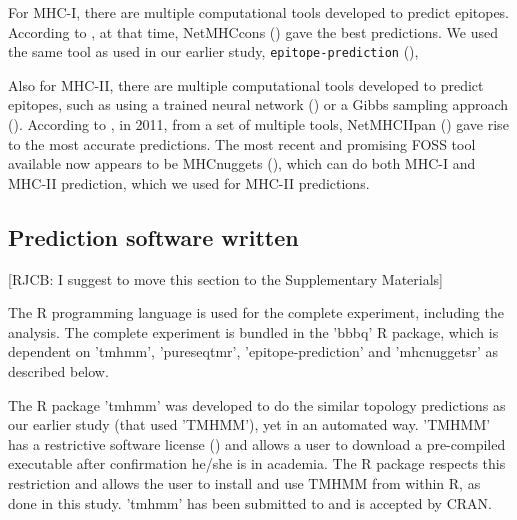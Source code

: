 
For MHC-I, there are multiple computational tools developed 
to predict epitopes. 
According to \cite{lundegaard2011prediction}, at that time,
NetMHCcons (\cite{karosiene2012netmhccons}) gave the best predictions.
We used the same tool as used in our earlier study, \verb;epitope-prediction; (\cite{bianchi2017}),


Also for MHC-II, there are multiple computational tools developed 
to predict epitopes,
such as using a trained neural network (\cite{nielsen2003reliable})
or a Gibbs sampling approach (\cite{nielsen2004improved}).
According to \cite{lundegaard2011prediction}, in 2011,
from a set of multiple tools, 
NetMHCIIpan (\cite{nielsen2008quantitative,karosiene2013netmhciipan})
gave rise to the most accurate predictions.
The most recent and promising FOSS tool available now appears
to be MHCnuggets (\cite{shao2020high}), which can do both MHC-I 
and MHC-II prediction, which we used for MHC-II predictions.

\subsection{Prediction software written}

[RJCB: I suggest to move this section to the Supplementary Materials]

The R programming language is used for the complete 
experiment, including the analysis.
The complete experiment is bundled in the 'bbbq' R package,
which is dependent on 'tmhmm', 'pureseqtmr', 
'epitope-prediction' and 'mhcnuggetsr'
as described below.


The R package 'tmhmm' was developed to do the similar topology
predictions as our earlier study (that used 'TMHMM'), yet in an automated way.
'TMHMM' has a restrictive software license (\cite{krogh2001predicting}) and allows a user
to download a pre-compiled executable after confirmation he/she
is in academia. The R package respects this restriction
and allows the user to install and use TMHMM from within R,
as done in this study.
'tmhmm' has been submitted to and is accepted by CRAN.

